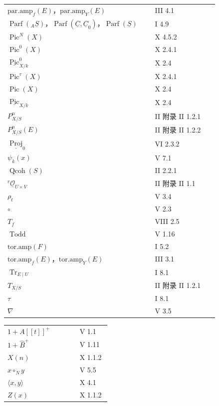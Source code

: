 \begin{longtable}{@{}p{0.65\linewidth}p{0.29\linewidth}@{}}
$\mathrm{par.amp}_f(E)$，$\mathrm{par.amp}_Y(E)$ & III 4.1\\
$\operatorname{Parf}({}_A\underline S)$，$\operatorname{Parf}(\underline C,\underline C_0)$，$\operatorname{Parf}(\underline S)$ & I 4.9\\
$\operatorname{Pic}^{N}(X)$ & X 4.5.2\\
$\operatorname{Pic}^{0}(X)$ & X 2.4.1\\
$\underline{\operatorname{Pic}}^{0}_{X/k}$ & X 2.4\\
$\operatorname{Pic}^{\tau}(X)$ & X 2.4.1\\
$\operatorname{Pic}(X)$ & X 2.4\\
$\underline{\operatorname{Pic}}_{X/k}$ & X 2.4\\[3pt]
$P^n_{X/S}$ & II 附录 II 1.2.1\\
$P^n_{X/S}(E)$ & II 附录 II 1.2.2\\
$\underline{\operatorname{Proj}}_0$ & VI 2.3.2\\
$\psi_k(x)$ & V 7.1\\[3pt]
$\operatorname{Qcoh}(S)$ & II 2.2.1\\[3pt]
${}^r\underline{\mathscr O}_{U\times V}$ & II 附录 II 1.1\\
$\rho_t$ & V 3.4\\
$\circ$ & V 2.3\\[3pt]
$T_f$ & VIII 2.5\\
$\operatorname{Todd}$ & V 1.16\\
$\mathrm{tor.amp}(F)$ & I 5.2\\
$\mathrm{tor.amp}_f(E)$，$\mathrm{tor.amp}_Y(E)$ & III 3.1\\
$\operatorname{Tr}_{E\mid U}$ & I 8.1\\
$T_{X/S}$ & II 附录 II 1.2.1\\[3pt]
$\tau$ & I 8.1\\
$\nabla$ & V 3.5
\end{longtable}

\begin{longtable}{@{}p{0.65\linewidth}p{0.29\linewidth}@{}}
$1+A[[t]]^+$ & V 1.1\\
$1+\widehat B^+$ & V 1.11\\[3pt]
$X(n)$ & X 1.1.2\\
$x\mathbin{\circ_N}y$ & V 5.5\\
$\langle x,y\rangle$ & X 4.1\\[3pt]
$Z(x)$ & X 1.1.2
\end{longtable}
